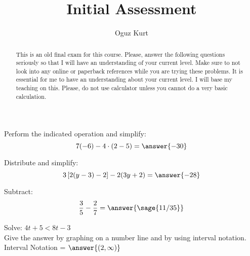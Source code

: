 \documentclass{ximera}
\title{Initial Assessment}
\author{Oguz Kurt}
\begin{document}
\begin{abstract}
This is an old final exam for this course. Please, answer the following questions seriously so that I will have an understanding of your current level. Make sure to not look into any online or paperback references while you are trying these problems. It is essential for me to have an understanding about your current level. I will base my teaching on this. Please, do not use calculator unless you cannot do a very basic calculation. 
\end{abstract}
\maketitle

\begin{problem}
Perform the indicated operation and simplify: \hspace{1cm} 
$$ 7(-6) - 4 \cdot (2 - 5) =\answer{-30}$$


\end{problem}



\begin{problem}
Distribute and simplify: \hspace{1cm} 
$$3 \left [ 2 (y - 3) - 2 \right ] - 2 (3y + 2)=\answer{-28}$$





\end{problem}



\begin{problem}
Subtract: \hspace{1cm} 
$$\displaystyle \frac{3}{5} - \frac{2}{7}=\answer{\sage{11/35}}$$





\end{problem}



\begin{problem}
Solve: \hspace{1cm} $4t + 5 < 8 t -3$\\

Give the answer by graphing on a number line and by using interval notation. \\

Interval Notation = $\answer{(2,\infty)}$





\end{problem}
\end{document}
